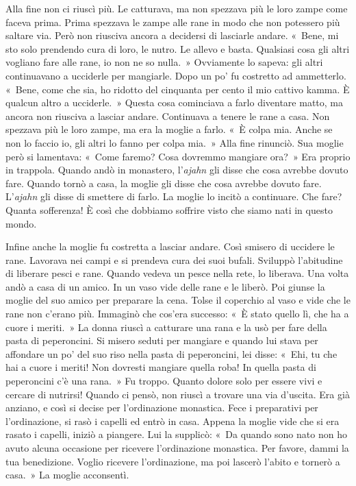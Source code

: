 Alla fine non ci riuscì più. Le catturava, ma non spezzava più le loro
zampe come faceva prima. Prima spezzava le zampe alle rane in modo che
non potessero più saltare via. Però non riusciva ancora a decidersi di
lasciarle andare. «~Bene, mi sto solo prendendo cura di loro, le nutro.
Le allevo e basta. Qualsiasi cosa gli altri vogliano fare alle rane, io
non ne so nulla.~» Ovviamente lo sapeva: gli altri continuavano a
ucciderle per mangiarle. Dopo un po' fu costretto ad ammetterlo. «~Bene,
come che sia, ho ridotto del cinquanta per cento il mio cattivo
kamma. È qualcun altro a ucciderle.~» Questa cosa cominciava a
farlo diventare matto, ma ancora non riusciva a lasciar andare.
Continuava a tenere le rane a casa. Non spezzava più le loro zampe, ma
era la moglie a farlo. «~È colpa mia. Anche se non lo faccio io, gli
altri lo fanno per colpa mia.~» Alla fine rinunciò. Sua moglie però si
lamentava: «~Come faremo? Cosa dovremmo mangiare ora?~» Era proprio in
trappola. Quando andò in monastero, l'\emph{ajahn} gli disse che cosa
avrebbe dovuto fare. Quando tornò a casa, la moglie gli disse che cosa
avrebbe dovuto fare. L'\emph{ajahn} gli disse di smettere di farlo. La
moglie lo incitò a continuare. Che fare? Quanta sofferenza! È così che
dobbiamo soffrire visto che siamo nati in questo mondo.

Infine anche la moglie fu costretta a lasciar andare. Così smisero di
uccidere le rane. Lavorava nei campi e si prendeva cura dei suoi bufali.
Sviluppò l'abitudine di liberare pesci e rane. Quando vedeva un pesce
nella rete, lo liberava. Una volta andò a casa di un amico. In un vaso
vide delle rane e le liberò. Poi giunse la moglie del suo amico per
preparare la cena. Tolse il coperchio al vaso e vide che le rane non
c'erano più. Immaginò che cos'era successo: «~È stato quello lì, che ha
a cuore i meriti.~» La donna riuscì a catturare una rana e la usò per
fare della pasta di peperoncini. Si misero seduti per mangiare e quando
lui stava per affondare un po' del suo riso nella pasta di peperoncini,
lei disse: «~Ehi, tu che hai a cuore i meriti! Non dovresti mangiare
quella roba! In quella pasta di peperoncini c'è una rana.~» Fu troppo.
Quanto dolore solo per essere vivi e cercare di nutrirsi! Quando ci
pensò, non riuscì a trovare una via d'uscita. Era già anziano, e così si
decise per l'ordinazione monastica. Fece i preparativi per
l'ordinazione, si rasò i capelli ed entrò in casa. Appena la moglie
vide che si era rasato i capelli, iniziò a piangere. Lui la supplicò:
«~Da quando sono nato non ho avuto alcuna occasione per ricevere
l'ordinazione monastica. Per favore, dammi la tua benedizione. Voglio
ricevere l'ordinazione, ma poi lascerò l'abito e tornerò a casa.~» La
moglie acconsentì.

